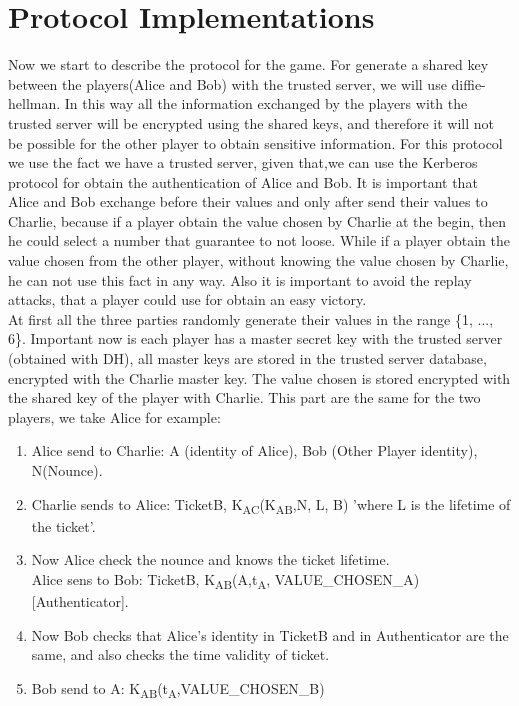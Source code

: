 \documentclass{article}
\begin{document}
\section{Protocol Implementations}
Now we start to describe the protocol for the game. For generate a shared key between the players(Alice and Bob) with the trusted server, we will use diffie-hellman. In this way all the information exchanged by the players with the trusted server will be encrypted using the shared keys, and therefore it will not be possible for the other player to obtain sensitive information. For this protocol we use the fact we have a trusted server, given that,we can use the Kerberos protocol for obtain the authentication of Alice and Bob. It is important that Alice and Bob exchange before their values and only after send their values to Charlie, because if a player obtain the value chosen by Charlie at the begin, then he could select a number that guarantee to not loose. While if a player obtain the value chosen from the other player, without knowing the value chosen by Charlie, he can not use this fact in any way. Also it is important to avoid the replay attacks, that a player could use for obtain an easy victory.\\
At first all the three parties randomly generate their values in the range \{1, ..., 6\}. Important now is each  player has a master secret key with the trusted server (obtained with DH), all master keys are stored in the trusted server database, encrypted with the Charlie master key. The value chosen is stored encrypted with the shared key of the player with Charlie.
This part are the same for the two players, we take Alice for example:\\
\begin{enumerate}
   \item Alice send to Charlie: A (identity of Alice), Bob (Other Player identity), N(Nounce).
   \item Charlie sends to Alice: TicketB, K\textsubscript{AC}(K\textsubscript{AB},N, L, B)   'where L is the lifetime of the ticket'.
   \item Now Alice check the nounce and knows the ticket lifetime.\\Alice sens to Bob: TicketB, K\textsubscript{AB}(A,t\textsubscript{A}, VALUE\_CHOSEN\_A)[Authenticator].
   \item Now Bob checks that Alice's identity in TicketB and in Authenticator are the same, and also checks the time validity of ticket.
   \item Bob send to A: K\textsubscript{AB}(t\textsubscript{A},VALUE\_CHOSEN\_B)
\end{enumerate}
\end{document}
